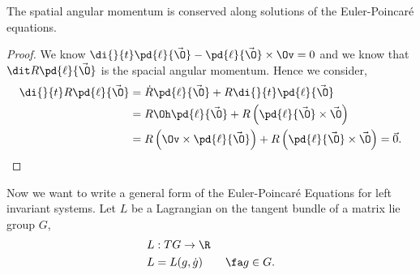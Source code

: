\begin{nthm}[]
  The spatial angular momentum is conserved along solutions of the Euler-Poincar\'e equations.
\end{nthm}
\begin{proof}
  We know $\di {}{t}\pd{\ell}{\vec \O} - \pd{\ell}{\vec \O} \times \Ov = 0$ and we know that $\dit R\pd{\ell}{\vec\O}$ is the spacial angular momentum. Hence we consider,
  \begin{align*}
    \di{}{t} R\pd{\ell}{\vec \O} &= \dot R \pd{\ell}{\vec \O} + R\di { }{t} \pd{\ell}{\vec\O}\\
    &= R\Oh\pd{\ell}{\vec\O} + R\left(\pd{\ell}{\vec \O} \times \vec\O\right)\\
    &= R\left(\Ov \times \pd{\ell}{\vec\O}\right) + R\left(\pd{\ell}{\vec \O} \times \vec\O\right) = \vec 0.
\end{align*}
\end{proof}

\noindent
Now we want to write a general form of the Euler-Poincar\'e Equations for left invariant systems. Let $L$ be a Lagrangian on the tangent bundle of a matrix lie group $G$,
\begin{align*}
  &L : TG \to \R\\
  &L = L(g, \dot g) \qquad \fa g \in G.
\end{align*}

